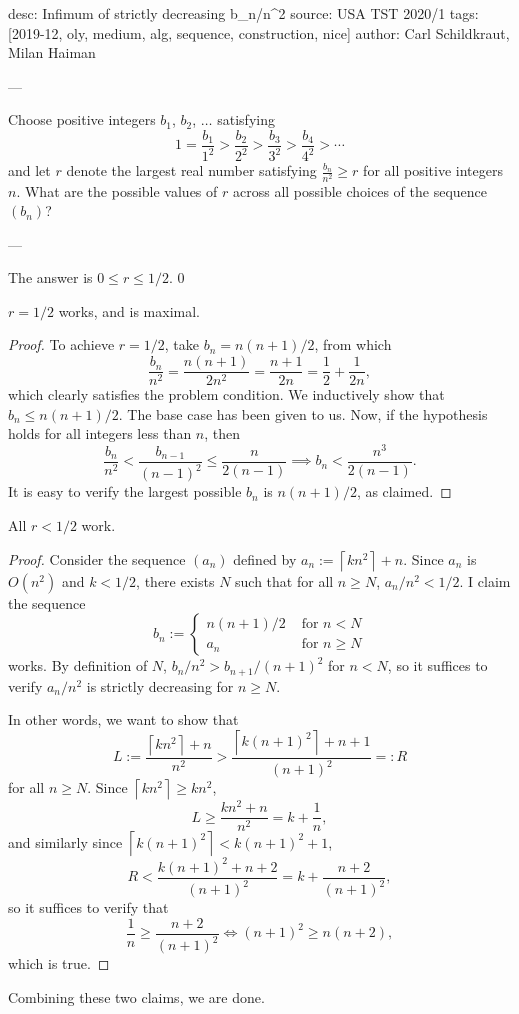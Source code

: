 desc: Infimum of strictly decreasing b_n/n^2
source: USA TST 2020/1
tags: [2019-12, oly, medium, alg, sequence, construction, nice]
author: Carl Schildkraut, Milan Haiman

---

Choose positive integers $b_1$, $b_2$, $\ldots$ satisfying \[1=\frac{b_1}{1^2}>\frac{b_2}{2^2}>\frac{b_3}{3^2}>\frac{b_4}{4^2}>\cdots\]
and let $r$ denote the largest real number satisfying $\frac{b_n}{n^2}\ge r$ for all positive integers $n$. What are the possible values of $r$ across all possible choices of the sequence $(b_n)$?

---

The answer is $0\le r\le1/2$.
\setcounter{claim}0
\begin{claim}
    $r=1/2$ works, and is maximal.
\end{claim}
\begin{proof}
    To achieve $r=1/2$, take $b_n=n(n+1)/2$, from which \[\frac{b_n}{n^2}=\frac{n(n+1)}{2n^2}=\frac{n+1}{2n}=\frac12+\frac1{2n},\]
    which clearly satisfies the problem condition. We inductively show that $b_n\le n(n+1)/2$. The base case has been given to us. Now, if the hypothesis holds for all integers less than $n$, then \[\frac{b_n}{n^2}<\frac{b_{n-1}}{(n-1)^2}\le\frac n{2(n-1)}\implies b_n<\frac{n^3}{2(n-1)}.\]
    It is easy to verify the largest possible $b_n$ is $n(n+1)/2$, as claimed.
\end{proof}
\begin{claim}
    All $r<1/2$ work.
\end{claim}
\begin{proof}
    Consider the sequence $(a_n)$ defined by $a_n:=\left\lceil kn^2\right\rceil+n$. Since $a_n$ is $O(n^2)$ and $k<1/2$, there exists $N$ such that for all $n\ge N$, $a_n/n^2<1/2$. I claim the sequence \[b_n:=\begin{cases}n(n+1)/2&\text{ for }n<N\\ a_n&\text{ for }n\ge N\end{cases}\]
    works. By definition of $N$, $b_n/n^2>b_{n+1}/(n+1)^2$ for $n<N$, so it suffices to verify $a_n/n^2$ is strictly decreasing for $n\ge N$.

    In other words, we want to show that \[L:=\frac{\left\lceil kn^2\right\rceil+n}{n^2}>\frac{\left\lceil k(n+1)^2\right\rceil+n+1}{(n+1)^2}=:R\]
    for all $n\ge N$. Since $\left\lceil kn^2\right\rceil\ge kn^2$, \[L\ge\frac{kn^2+n}{n^2}=k+\frac1n,\]
    and similarly since $\left\lceil k(n+1)^2\right\rceil<k(n+1)^2+1$, \[R<\frac{k(n+1)^2+n+2}{(n+1)^2}=k+\frac{n+2}{(n+1)^2},\]
    so it suffices to verify that \[\frac1n\ge\frac{n+2}{(n+1)^2}\iff(n+1)^2\ge n(n+2),\]
    which is true.
\end{proof}

Combining these two claims, we are done.

